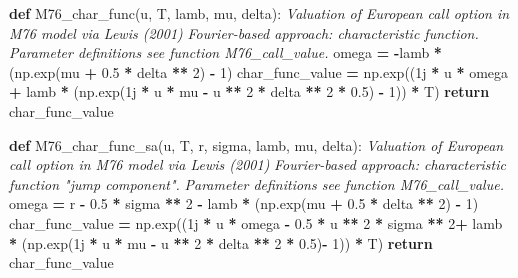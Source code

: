 \documentclass[
]{book}
\newenvironment{Shaded}{\begin{snugshade}}{\end{snugshade}}
\newcommand{\CommentTok}[1]{\textcolor[rgb]{0.56,0.35,0.01}{\textit{#1}}}
\newcommand{\ControlFlowTok}[1]{\textcolor[rgb]{0.13,0.29,0.53}{\textbf{#1}}}
\newcommand{\DecValTok}[1]{\textcolor[rgb]{0.00,0.00,0.81}{#1}}
\newcommand{\FloatTok}[1]{\textcolor[rgb]{0.00,0.00,0.81}{#1}}
\newcommand{\KeywordTok}[1]{\textcolor[rgb]{0.13,0.29,0.53}{\textbf{#1}}}
\newcommand{\NormalTok}[1]{#1}
\newcommand{\OperatorTok}[1]{\textcolor[rgb]{0.81,0.36,0.00}{\textbf{#1}}}
\newcommand{\OtherTok}[1]{\textcolor[rgb]{0.56,0.35,0.01}{#1}}
\begin{document}
\begin{Shaded}
\begin{Highlighting}[]
\KeywordTok{def}\NormalTok{ M76\_char\_func(u, T, lamb, mu, delta):}
  \CommentTok{\textquotesingle{}\textquotesingle{}\textquotesingle{} Valuation of European call option in M76 model via Lewis (2001)}
\CommentTok{  Fourier{-}based approach: characteristic function.}
\CommentTok{  Parameter definitions see function M76\_call\_value.\textquotesingle{}\textquotesingle{}\textquotesingle{}}
\NormalTok{  omega }\OperatorTok{=} \OperatorTok{{-}}\NormalTok{lamb }\OperatorTok{*}\NormalTok{ (np.exp(mu }\OperatorTok{+} \FloatTok{0.5} \OperatorTok{*}\NormalTok{ delta }\OperatorTok{**} \DecValTok{2}\NormalTok{) }\OperatorTok{{-}} \DecValTok{1}\NormalTok{)}
\NormalTok{  char\_func\_value }\OperatorTok{=}\NormalTok{ np.exp((}\OtherTok{1j} \OperatorTok{*}\NormalTok{ u }\OperatorTok{*}\NormalTok{ omega }\OperatorTok{+}\NormalTok{ lamb }\OperatorTok{*}\NormalTok{ (np.exp(}\OtherTok{1j} \OperatorTok{*}\NormalTok{ u }\OperatorTok{*}\NormalTok{ mu }\OperatorTok{{-}}\NormalTok{ u }\OperatorTok{**} \DecValTok{2} \OperatorTok{*}\NormalTok{ delta }\OperatorTok{**} \DecValTok{2} \OperatorTok{*} \FloatTok{0.5}\NormalTok{) }\OperatorTok{{-}} \DecValTok{1}\NormalTok{)) }\OperatorTok{*}\NormalTok{ T)}
  \ControlFlowTok{return}\NormalTok{ char\_func\_value}

\KeywordTok{def}\NormalTok{ M76\_char\_func\_sa(u, T, r, sigma, lamb, mu, delta):}
  \CommentTok{\textquotesingle{}\textquotesingle{}\textquotesingle{} Valuation of European call option in M76 model via Lewis (2001)}
\CommentTok{  Fourier{-}based approach: characteristic function "jump component".}
\CommentTok{  Parameter definitions see function M76\_call\_value.\textquotesingle{}\textquotesingle{}\textquotesingle{}}
\NormalTok{  omega }\OperatorTok{=}\NormalTok{ r }\OperatorTok{{-}} \FloatTok{0.5} \OperatorTok{*}\NormalTok{ sigma }\OperatorTok{**} \DecValTok{2} \OperatorTok{{-}}\NormalTok{ lamb }\OperatorTok{*}\NormalTok{ (np.exp(mu }\OperatorTok{+} \FloatTok{0.5} \OperatorTok{*}\NormalTok{ delta }\OperatorTok{**} \DecValTok{2}\NormalTok{) }\OperatorTok{{-}} \DecValTok{1}\NormalTok{)}
\NormalTok{  char\_func\_value }\OperatorTok{=}\NormalTok{ np.exp((}\OtherTok{1j} \OperatorTok{*}\NormalTok{ u }\OperatorTok{*}\NormalTok{ omega }\OperatorTok{{-}} \FloatTok{0.5} \OperatorTok{*}\NormalTok{ u }\OperatorTok{**} \DecValTok{2} \OperatorTok{*}\NormalTok{ sigma }\OperatorTok{**} \DecValTok{2}\OperatorTok{+}\NormalTok{ lamb }\OperatorTok{*}\NormalTok{ (np.exp(}\OtherTok{1j} \OperatorTok{*}\NormalTok{ u }\OperatorTok{*}\NormalTok{ mu }\OperatorTok{{-}}\NormalTok{ u }\OperatorTok{**} \DecValTok{2} \OperatorTok{*}\NormalTok{ delta }\OperatorTok{**} \DecValTok{2} \OperatorTok{*} \FloatTok{0.5}\NormalTok{)}\OperatorTok{{-}} \DecValTok{1}\NormalTok{)) }\OperatorTok{*}\NormalTok{ T)}
  \ControlFlowTok{return}\NormalTok{ char\_func\_value}


\end{Highlighting}
\end{Shaded}
\end{document}
